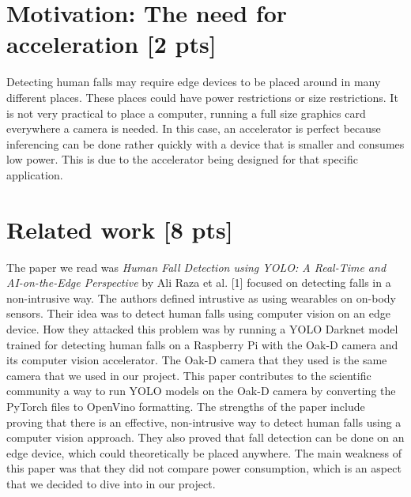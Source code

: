 \documentclass[sigconf,authorversion,nonacm]{acmart}
\begin{document}
\section{Motivation: The need for acceleration {\small {[2 pts]}}}

Detecting human falls may require edge devices to be placed around in many different places. These places could have power restrictions or size restrictions. It is not very practical to place a computer, running a full size graphics card everywhere a camera is needed. In this case, an accelerator is perfect because inferencing can be done rather quickly with a device that is smaller and consumes low power. This is due to the accelerator being designed for that specific application.

\section{Related work {\small {[8 pts]}}}



The paper we read was \textit{Human Fall Detection using YOLO: A Real{-}Time and AI{-}on{-}the{-}Edge Perspective} by Ali Raza et al. [1] focused on detecting falls in a non-intrusive way. The authors defined intrustive as using wearables on on-body sensors. Their idea was to detect human falls using computer vision on an edge device. How they attacked this problem was by running a YOLO Darknet model trained for detecting human falls on a Raspberry Pi with the Oak-D camera and its computer vision accelerator. The Oak-D camera that they used is the same camera that we used in our project. This paper contributes to the scientific community a way to run YOLO models on the Oak-D camera by converting the PyTorch files to OpenVino formatting. The strengths of the paper include proving that there is an effective, non-intrusive way to detect human falls using a computer vision approach. They also proved that fall detection can be done on an edge device, which could theoretically be placed anywhere. The main weakness of this paper was that they did not compare power consumption, which is an aspect that we decided to dive into in our project.
\end{document}
